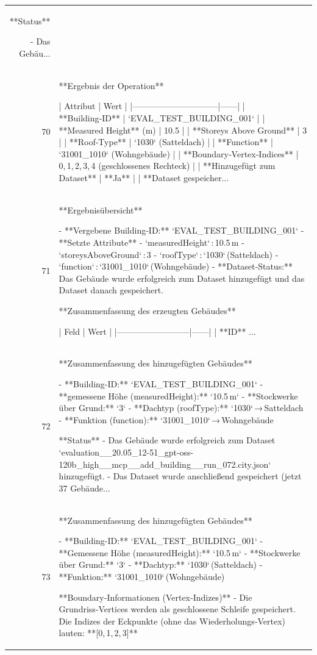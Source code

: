 \documentclass[a4paper,11pt]{article}
\begin{document}
\begin{table}[ht]
\begin{tabular}{r p{12cm}}
**Status**

- Das Gebäu... \\
70 & **Ergebnis der Operation**

| Attribut                     | Wert |
|------------------------------|------|
| **Building‑ID**              | `EVAL\_TEST\_BUILDING\_001` |
| **Measured Height** (m)      | 10.5 |
| **Storeys Above Ground**     | 3 |
| **Roof‑Type**                | `1030` (Satteldach) |
| **Function**                 | `31001\_1010` (Wohngebäude) |
| **Boundary‑Vertex‑Indices**  | 0, 1, 2, 3, 4 (geschlossenes Rechteck) |
| **Hinzugefügt zum Dataset**  | **Ja** |
| **Dataset gespeicher... \\
71 & **Ergebnisübersicht**

- **Vergebene Building‑ID:** `EVAL\_TEST\_BUILDING\_001`  
- **Setzte Attribute**  
  - `measuredHeight` : 10.5 m  
  - `storeysAboveGround` : 3  
  - `roofType` : `1030` (Satteldach)  
  - `function` : `31001\_1010` (Wohngebäude)  
- **Dataset‑Status:** Das Gebäude wurde erfolgreich zum Dataset hinzugefügt und das Dataset danach gespeichert.  

**Zusammenfassung des erzeugten Gebäudes**  

| Feld                     | Wert |
|--------------------------|------|
| **ID**       ... \\
72 & **Zusammenfassung des hinzugefügten Gebäudes**

- **Building-ID:** `EVAL\_TEST\_BUILDING\_001`  
- **gemessene Höhe (measuredHeight):** `10.5 m`  
- **Stockwerke über Grund:** `3`  
- **Dachtyp (roofType):** `1030` → Satteldach  
- **Funktion (function):** `31001\_1010` → Wohngebäude  

**Status**  
- Das Gebäude wurde erfolgreich zum Dataset `evaluation\_\_20.05\_12-51\_gpt-oss-120b\_high\_\_mcp\_\_add\_building\_\_run\_072.city.json` hinzugefügt.  
- Das Dataset wurde anschließend gespeichert (jetzt 37 Gebäude... \\
73 & **Zusammenfassung des hinzugefügten Gebäudes**

- **Building-ID:** `EVAL\_TEST\_BUILDING\_001`  
- **Gemessene Höhe (measuredHeight):** `10.5 m`  
- **Stockwerke über Grund:** `3`  
- **Dachtyp:** `1030` (Satteldach)  
- **Funktion:** `31001\_1010` (Wohngebäude)  

**Boundary‑Informationen (Vertex‑Indizes)**
- Die Grundriss‑Vertices werden als geschlossene Schleife gespeichert. Die Indizes der Eckpunkte (ohne das Wiederholungs‑Vertex) lauten: **[0, 1, 2, 3]**  


\end{tabular}
\end{table}
\end{document}
